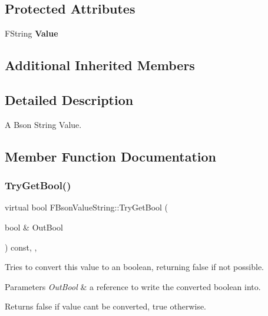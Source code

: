 \subsection*{Protected Attributes}
\begin{DoxyCompactItemize}
\item 
\mbox{\label{class_f_bson_value_string_a4cb7ba55f5facf934531265b06bf9fb9}} 
F\+String {\bfseries Value}
\end{DoxyCompactItemize}
\subsection*{Additional Inherited Members}


\subsection{Detailed Description}
A Bson String Value. 

\subsection{Member Function Documentation}
\mbox{\label{class_f_bson_value_string_a81c2e67998032708c613773746c962bd}} 
\subsubsection{\texorpdfstring{Try\+Get\+Bool()}{TryGetBool()}}
{\footnotesize\ttfamily virtual bool F\+Bson\+Value\+String\+::\+Try\+Get\+Bool (\begin{DoxyParamCaption}\item[{bool \&}]{Out\+Bool }\end{DoxyParamCaption}) const\hspace{0.3cm}{\ttfamily [inline]}, {\ttfamily [override]}, {\ttfamily [virtual]}}

Tries to convert this value to an boolean, returning false if not possible.


\begin{DoxyParams}{Parameters}
{\em Out\+Bool} & a reference to write the converted boolean into. \\
\hline
\end{DoxyParams}
\begin{DoxyReturn}{Returns}
false if value can\textquotesingle{}t be converted, true otherwise. 
\end{DoxyReturn}


